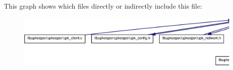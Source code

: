 This graph shows which files directly or indirectly include this file:
\nopagebreak
\begin{figure}[H]
\begin{center}
\leavevmode
\includegraphics[width=400pt]{upk__include_8h__dep__incl}
\end{center}
\end{figure}

